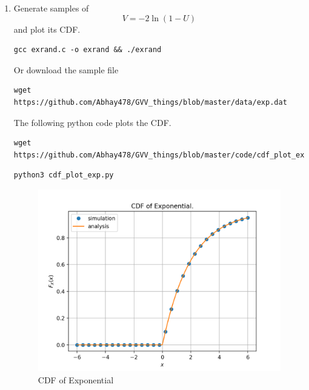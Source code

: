 \documentclass[journal,12pt,twocolumn]{IEEEtran}
\renewcommand\thesection{\arabic{section}}
\providecommand{\brak}[1]{\ensuremath{\left(#1\right)}}
\theoremstyle{remark}
\numberwithin{equation}{section}
\numberwithin{equation}{section}
\begin{document}
\begin{enumerate}[label=\thesection.\arabic*,ref=\thesection.\theenumi]
%
\item
Generate samples of 
%
\begin{equation}
V = -2\ln\brak{1-U}
\end{equation}
%
and plot its CDF.  

    
    \begin{lstlisting}
gcc exrand.c -o exrand && ./exrand
    \end{lstlisting}

Or download the sample file
\begin{lstlisting}
wget https://github.com/Abhay478/GVV_things/blob/master/data/exp.dat   
\end{lstlisting}

The following python code plots the CDF.
\begin{lstlisting}
wget https://github.com/Abhay478/GVV_things/blob/master/code/cdf_plot_exp.py
\end{lstlisting}
    
\begin{lstlisting}
python3 cdf_plot_exp.py
\end{lstlisting}

\begin{figure}[!h]
    \caption{CDF of Exponential}
    \includegraphics[width = \columnwidth]{exp.png}
\end{figure}


\end{enumerate}
\end{document}
